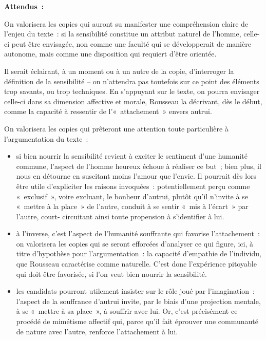 {\textbf{Attendus~:}

On valorisera les copies qui auront su manifester une compréhension claire de
l'enjeu du texte~: si la sensibilité constitue un attribut naturel de l'homme, celle-ci peut
être envisagée, non comme une faculté qui se développerait de manière autonome,
mais comme une disposition qui requiert d'être orientée.

Il serait éclairant, à un moment ou à un autre de la copie, d'interroger la
définition de la sensibilité – on n'attendra pas toutefois sur ce point des éléments trop
savants, ou trop techniques. En s'appuyant sur le texte, on pourra envisager celle-ci
dans sa dimension affective et morale, Rousseau la décrivant, dès le début, comme la
capacité à ressentir de l'«~attachement~» envers autrui.

On valorisera les copies qui prêteront une attention toute particulière à
l'argumentation du texte~:

\begin{itemize}
\item si bien nourrir la sensibilité revient à exciter le sentiment d'une humanité
commune, l'aspect de l'homme heureux échoue à réaliser ce but~; bien plus, il
nous en détourne en suscitant moins l'amour que l'envie. Il pourrait dès lors être
utile d'expliciter les raisons invoquées~: potentiellement perçu comme
«~exclusif~», voire excluant, le bonheur d'autrui, plutôt qu'il n'invite à se «~mettre
à la place~» de l'autre, conduit à se sentir «~mis à l'écart~» par l'autre, court-
circuitant ainsi toute propension à s'identifier à lui.
\item à l'inverse, c'est l'aspect de l'humanité souffrante qui favorise l'attachement~:
on valorisera les copies qui se seront efforcées d'analyser ce qui figure, ici, à
titre d'hypothèse pour l'argumentation~: la capacité d'empathie de l'individu, que
Rousseau caractérise comme naturelle. C'est donc l'expérience pitoyable qui
doit être favorisée, si l'on veut bien nourrir la sensibilité.
\item les candidats pourront utilement insister sur le rôle joué par l'imagination~:
l'aspect de la souffrance d'autrui invite, par le biais d'une projection mentale, à
se «~mettre à sa place~», à souffrir avec lui. Or, c'est précisément ce procédé
de mimétisme affectif qui, parce qu'il fait éprouver une communauté de nature
avec l'autre, renforce l'attachement à lui.
\end{itemize}

}
